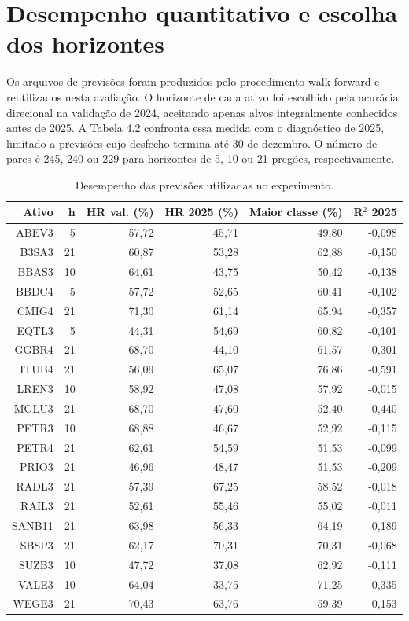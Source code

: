 \section{Desempenho quantitativo e escolha dos horizontes}
Os arquivos de previsões foram produzidos pelo procedimento walk-forward e reutilizados nesta avaliação. O horizonte de cada ativo foi escolhido pela acurácia direcional na validação de 2024, aceitando apenas alvos integralmente conhecidos antes de 2025. A Tabela 4.2 confronta essa medida com o diagnóstico de 2025, limitado a previsões cujo desfecho termina até 30 de dezembro. O número de pares é 245, 240 ou 229 para horizontes de 5, 10 ou 21 pregões, respectivamente.

\begin{table}[H]
\centering
\caption{Desempenho das previsões utilizadas no experimento.}
{\footnotesize
\begin{tabular}{@{}rrrrrr@{}}
\hline
Ativo & h & HR val. (\%) & HR 2025 (\%) & Maior classe (\%) & R$^{2}$ 2025 \\ \hline
ABEV3 & 5 & 57,72 & 45,71 & 49,80 & -0,098 \\
B3SA3 & 21 & 60,87 & 53,28 & 62,88 & -0,150 \\
BBAS3 & 10 & 64,61 & 43,75 & 50,42 & -0,138 \\
BBDC4 & 5 & 57,72 & 52,65 & 60,41 & -0,102 \\
CMIG4 & 21 & 71,30 & 61,14 & 65,94 & -0,357 \\
EQTL3 & 5 & 44,31 & 54,69 & 60,82 & -0,101 \\
GGBR4 & 21 & 68,70 & 44,10 & 61,57 & -0,301 \\
ITUB4 & 21 & 56,09 & 65,07 & 76,86 & -0,591 \\
LREN3 & 10 & 58,92 & 47,08 & 57,92 & -0,015 \\
MGLU3 & 21 & 68,70 & 47,60 & 52,40 & -0,440 \\
PETR3 & 10 & 68,88 & 46,67 & 52,92 & -0,115 \\
PETR4 & 21 & 62,61 & 54,59 & 51,53 & -0,099 \\
PRIO3 & 21 & 46,96 & 48,47 & 51,53 & -0,209 \\
RADL3 & 21 & 57,39 & 67,25 & 58,52 & -0,018 \\
RAIL3 & 21 & 52,61 & 55,46 & 55,02 & -0,011 \\
SANB11 & 21 & 63,98 & 56,33 & 64,19 & -0,189 \\
SBSP3 & 21 & 62,17 & 70,31 & 70,31 & -0,068 \\
SUZB3 & 10 & 47,72 & 37,08 & 62,92 & -0,111 \\
VALE3 & 10 & 64,04 & 33,75 & 71,25 & -0,335 \\
WEGE3 & 21 & 70,43 & 63,76 & 59,39 & 0,153 \\
\hline
\end{tabular}}
\par{}
\end{table}

